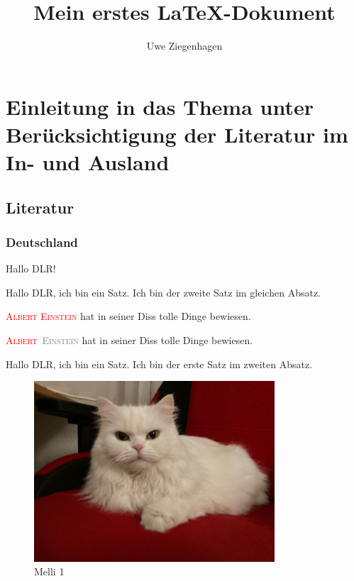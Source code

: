 \documentclass[12pt,ngerman,parskip=half]{scrartcl}
\author{Uwe Ziegenhagen}
\title{Mein erstes LaTeX-Dokument}
\newcommand{\person}[1]{\textsc{\textcolor{red}{#1}}}
\newcommand{\Person}[2]{\textsc{\textcolor{red}{#1}~\textcolor{gray}{#2}}}
\begin{document}
\maketitle

\tableofcontents


\listoffigures

\listoftodos

\section[Einleitung und Überblick]{Einleitung in das Thema unter Berücksichtigung der Literatur im In- und Ausland}\label{sec:Einleitung}
\subsection{Literatur}

\subsubsection{Deutschland}

Hallo DLR!

Hallo DLR, ich bin ein Satz. Ich bin der zweite Satz im gleichen Absatz.

\person{Albert Einstein} hat in seiner Diss tolle Dinge bewiesen. 

\Person{Albert}{Einstein} hat in seiner Diss tolle Dinge bewiesen. 

Hallo DLR, ich bin ein Satz.  Ich bin der erste Satz im zweiten Absatz.

\begin{figure}
\begin{center}
\includegraphics[width=0.8\textwidth]{Bilder/Katze}
\caption{Melli 1}\label{fig:Katze}
\end{center}
\end{figure}
\end{document}
